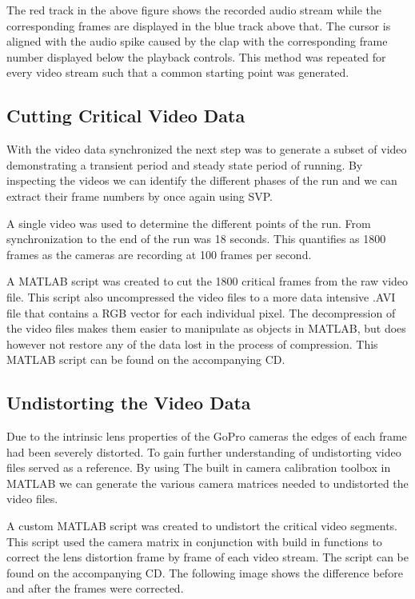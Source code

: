 The red track in the above figure shows the recorded audio stream while the corresponding frames are displayed in the blue track above that. The cursor is aligned with the audio spike caused by the clap with the corresponding frame number displayed below the playback controls. This method was repeated for every video stream such that a common starting point was generated. 

\subsection{Cutting Critical Video Data}
With the video data synchronized the next step was to generate a subset of video demonstrating a transient period and steady state period of running. By inspecting the videos we can identify the different phases of the run and we can extract their frame numbers by once again using SVP.

A single video was used to determine the different points of the run. From synchronization to the end of the run was 18 seconds. This quantifies as 1800 frames as the cameras are recording at 100 frames per second.

A MATLAB script was created to cut the 1800 critical frames from the raw video file. This script also uncompressed the video files to a more data intensive .AVI file that contains a RGB vector for each individual pixel. The decompression of the video files makes them easier to manipulate as objects in MATLAB, but does however not restore any of the data lost in the process of compression. This MATLAB script can be found on the accompanying CD.

\subsection{Undistorting the Video Data}
Due to the intrinsic lens properties of the GoPro cameras the edges of each frame had been severely distorted. To gain further understanding of undistorting video files \cite{Hartley2004} served as a reference. By using The built in camera calibration toolbox in MATLAB we can generate the various camera matrices needed to undistorted the video files.

A custom MATLAB script was created to undistort the critical video segments. This script used the camera matrix in conjunction with build in functions to correct the lens distortion frame by frame of each video stream. The script can be found on the accompanying CD. The following image shows the difference before and after the frames were corrected.

